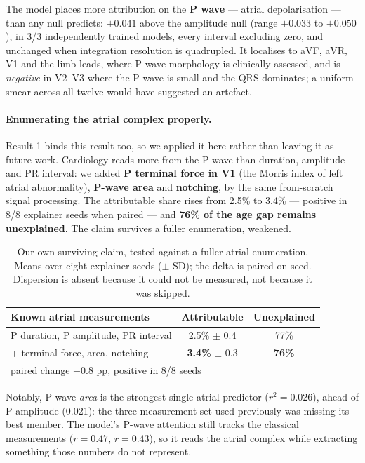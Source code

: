 \documentclass{article}
\begin{document}
The model places more attribution on the \textbf{P wave} --- atrial
depolarisation --- than any null predicts: $+0.041$ above the amplitude null
(range $+0.033$ to $+0.050$), in 3/3 independently trained models, every interval
excluding zero, and unchanged when integration resolution is quadrupled. It
localises to aVF, aVR, V1 and the limb leads, where P-wave morphology is
clinically assessed, and is \emph{negative} in V2--V3 where the P wave is small
and the QRS dominates; a uniform smear across all twelve would have suggested an
artefact.

\paragraph{Enumerating the atrial complex properly.} Result 1 binds this result
too, so we applied it here rather than leaving it as future work. Cardiology
reads more from the P wave than duration, amplitude and PR interval: we added
\textbf{P terminal force in V1} (the Morris index of left atrial abnormality),
\textbf{P-wave area} and \textbf{notching}, by the same from-scratch signal
processing. The attributable share rises from 2.5\% to 3.4\% --- positive in 8/8
explainer seeds when paired --- and \textbf{76\% of the age gap remains
unexplained}. The claim survives a fuller enumeration, weakened.

\begin{table}[t]
\centering
\caption{Our own surviving claim, tested against a fuller atrial enumeration.
Means over eight explainer seeds ($\pm$ SD); the delta is paired on seed.
Dispersion is absent because it could not be measured, not because it was
skipped.}
\label{tab:atrial}
\small
\begin{tabular}{lcc}
\toprule
Known atrial measurements & Attributable & Unexplained \\
\midrule
P duration, P amplitude, PR interval & 2.5\% $\pm$ 0.4 & 77\% \\
\quad + terminal force, area, notching & \textbf{3.4\%} $\pm$ 0.3 & \textbf{76\%} \\
\midrule
\multicolumn{3}{l}{\footnotesize paired change $+0.8$ pp, positive in 8/8 seeds}\\
\bottomrule
\end{tabular}
\end{table}

Notably, P-wave \emph{area} is the strongest single atrial predictor
($r^2 = 0.026$), ahead of P amplitude (0.021): the three-measurement set used
previously was missing its best member. The model's P-wave attention still tracks
the classical measurements ($r = 0.47$, $r = 0.43$), so it reads the atrial
complex while extracting something those numbers do not represent.
\end{document}
